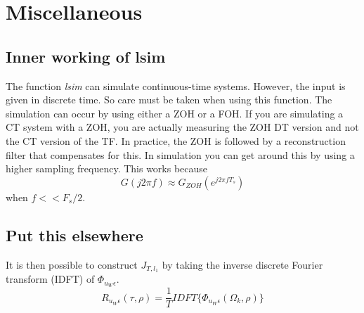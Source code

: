 \section{Miscellaneous}
\subsection{Inner working of lsim}
The function \emph{lsim} can simulate continuous-time systems. However, the input is given in discrete time. So care must be taken when using this function. The simulation can occur by using either a ZOH or a FOH. If you are simulating a CT system with a ZOH, you are actually measuring the ZOH DT version and not the CT version of the TF. In practice, the ZOH is followed by a reconstruction filter that compensates for this. In simulation you can get around this by using a higher sampling frequency. This works because
\begin{equation*}
    G(j 2 \pi f) \approx G_{ZOH}(e^{j 2 \pi f T_s})
\end{equation*}
when $f << F_s/2$.


\subsection{Put this elsewhere}
It is then possible to construct $J_{T,l_1}$ by taking the inverse discrete Fourier transform (IDFT) of $\Phi_{u_W \epsilon}$.
\begin{equation*}
    R_{u_W \epsilon}(\tau,\rho) = \frac{1}{T} IDFT\{\Phi_{u_W \epsilon}(\Omega_k,\rho)\}
\end{equation*}
